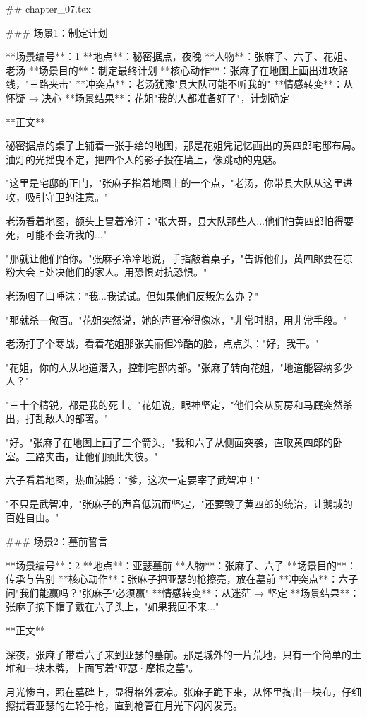 ## chapter_07.tex

### 场景1：制定计划

**场景编号**：1  
**地点**：秘密据点，夜晚  
**人物**：张麻子、六子、花姐、老汤  
**场景目的**：制定最终计划  
**核心动作**：张麻子在地图上画出进攻路线，"三路夹击"  
**冲突点**：老汤犹豫"县大队可能不听我的"  
**情感转变**：从怀疑 → 决心  
**场景结果**：花姐"我的人都准备好了"，计划确定

**正文**

秘密据点的桌子上铺着一张手绘的地图，那是花姐凭记忆画出的黄四郎宅邸布局。油灯的光摇曳不定，把四个人的影子投在墙上，像跳动的鬼魅。

"这里是宅邸的正门，"张麻子指着地图上的一个点，"老汤，你带县大队从这里进攻，吸引守卫的注意。"

老汤看着地图，额头上冒着冷汗："张大哥，县大队那些人...他们怕黄四郎怕得要死，可能不会听我的..."

"那就让他们怕你。"张麻子冷冷地说，手指敲着桌子，"告诉他们，黄四郎要在凉粉大会上处决他们的家人。用恐惧对抗恐惧。"

老汤咽了口唾沫："我...我试试。但如果他们反叛怎么办？"

"那就杀一儆百。"花姐突然说，她的声音冷得像冰，"非常时期，用非常手段。"

老汤打了个寒战，看着花姐那张美丽但冷酷的脸，点点头："好，我干。"

"花姐，你的人从地道潜入，控制宅邸内部。"张麻子转向花姐，"地道能容纳多少人？"

"三十个精锐，都是我的死士。"花姐说，眼神坚定，"他们会从厨房和马厩突然杀出，打乱敌人的部署。"

"好。"张麻子在地图上画了三个箭头，"我和六子从侧面突袭，直取黄四郎的卧室。三路夹击，让他们顾此失彼。"

六子看着地图，热血沸腾："爹，这次一定要宰了武智冲！"

"不只是武智冲，"张麻子的声音低沉而坚定，"还要毁了黄四郎的统治，让鹅城的百姓自由。"

### 场景2：墓前誓言

**场景编号**：2  
**地点**：亚瑟墓前  
**人物**：张麻子、六子  
**场景目的**：传承与告别  
**核心动作**：张麻子把亚瑟的枪擦亮，放在墓前  
**冲突点**：六子问"我们能赢吗？"张麻子"必须赢"  
**情感转变**：从迷茫 → 坚定  
**场景结果**：张麻子摘下帽子戴在六子头上，"如果我回不来..."

**正文**

深夜，张麻子带着六子来到亚瑟的墓前。那是城外的一片荒地，只有一个简单的土堆和一块木牌，上面写着"亚瑟·摩根之墓"。

月光惨白，照在墓碑上，显得格外凄凉。张麻子跪下来，从怀里掏出一块布，仔细擦拭着亚瑟的左轮手枪，直到枪管在月光下闪闪发亮。

